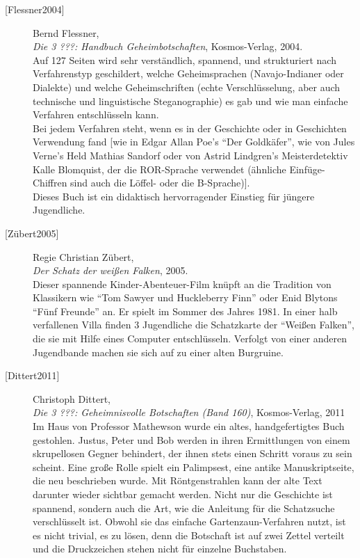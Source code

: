\begin{description}
\item[\textrm{[Flessner2004]}] 
    Bernd Flessner, \\
    {\em Die 3 ???: Handbuch Geheimbotschaften},
    Kosmos-Verlag, 2004. \\
    Auf 127 Seiten wird sehr verständlich, spannend, und strukturiert nach
    Verfahrenstyp geschildert, welche Geheimsprachen (Navajo-Indianer oder
    Dialekte) und welche Geheimschriften (echte Verschlüsselung, aber auch
    technische und linguistische Steganographie) es gab und wie man
    einfache Verfahren entschlüsseln kann.\\
    Bei jedem Verfahren steht, wenn es in der Geschichte oder in Geschichten
    Verwendung fand [wie in Edgar Allan Poe's "`Der Goldkäfer"', wie von
    Jules Verne's Held Mathias Sandorf oder von Astrid Lindgren's
    Meisterdetektiv Kalle Blomquist, der die ROR-Sprache verwendet
    (ähnliche Einfüge-Chiffren sind auch die Löffel- oder die B-Sprache)].
    \\
    Dieses Buch ist ein didaktisch hervorragender Einstieg für jüngere
    Jugendliche.\\


\item[\textrm{[Zübert2005]}] 
    Regie Christian Zübert, \\
    {\em Der Schatz der weißen Falken}, 2005. \\
    Dieser spannende Kinder-Abenteuer-Film knüpft an die Tradition von
    Klassikern wie "`Tom Sawyer und Huckleberry Finn"' oder Enid Blytons
    "`Fünf Freunde"' an. Er spielt im Sommer des Jahres 1981.
    In einer halb verfallenen Villa finden 3 Jugendliche die Schatzkarte
    der "`Weißen Falken"', die sie mit Hilfe eines Computer entschlüsseln.
    Verfolgt von einer anderen Jugendbande machen sie sich auf zu einer
    alten Burgruine.\\


\item[\textrm{[Dittert2011]}] 
    Christoph Dittert, \\
    {\em Die 3 ???: Geheimnisvolle Botschaften (Band 160)},
    Kosmos-Verlag, 2011 \\
    Im Haus von Professor Mathewson wurde ein altes, handgefertigtes Buch gestohlen.
    Justus, Peter und Bob werden in ihren Ermittlungen von einem skrupellosen Gegner
    behindert, der ihnen stets einen Schritt voraus zu sein scheint.
    Eine große Rolle spielt ein Palimpsest, eine antike Manuskriptseite, die neu
    beschrieben wurde. Mit Röntgenstrahlen kann der alte Text darunter wieder sichtbar
    gemacht werden.
    Nicht nur die Geschichte ist spannend, sondern auch die Art, wie die Anleitung für
    die Schatzsuche verschlüsselt ist. Obwohl sie das einfache Gartenzaun-Verfahren
    nutzt, ist es nicht trivial, es zu lösen, denn die Botschaft ist auf zwei Zettel
    verteilt und die Druckzeichen stehen nicht für einzelne Buchstaben.\\





\end{description}
